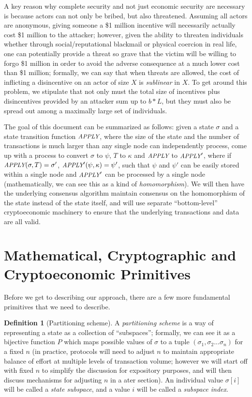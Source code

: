 \documentclass[11pt,a4paper]{article}
\theoremstyle{plain}
\theoremstyle{definition}
\newtheorem{defn}{Definition}[section]
\theoremstyle{remark}
\newcommand{\makeintoafunction}[1]{\textit{\uppercase{\small #1}}}
\newcommand{\APPLY}{\makeintoafunction{apply}}
\begin{document}
A key reason why complete security and not just economic security are necessary is because actors can not only be bribed, but also threatened. Assuming all actors are anonymous, giving someone a \$1 million incentive will necessarily actually cost \$1 million to the attacker; however, given the ability to threaten individuals whether through social/reputational blackmail or physical coercion in real life, one can potentially provide a threat so grave that the victim will be willing to forgo \$1 million in order to avoid the adverse consequence at a much lower cost than \$1 million; formally, we can say that when threats are allowed, the cost of inflicting a disincentive on an actor of size $X$ is \emph{sublinear} in $X$. To get around this problem, we stipulate that not only must the total size of incentives plus disincentives provided by an attacker sum up to $b * L$, but they must also be spread out among a maximally large set of individuals.

The goal of this document can be summarized as follows: given a state $\sigma$ and a state transition function $\APPLY$, where the size of the state and the number of transactions is much larger than any single node can independently process, come up with a process to convert $\sigma$ to $\psi$, $T$ to $\kappa$ and $\APPLY$ to $\APPLY'$, where if $\APPLY(\sigma, T) = \sigma'$, $\APPLY'(\psi, \kappa) = \psi'$, such that $\psi$ and $\psi'$ can be easily stored within a single node and $\APPLY'$ can be processed by a single node (mathematically, we can see this as a kind of \emph{homomorphism}). We will then have the underlying consensus algorithm maintain consensus on the homomorphism of the state instead of the state itself, and will use separate ``bottom-level'' cryptoeconomic machinery to ensure that the underlying transactions and data are all valid.

\section{Mathematical, Cryptographic and Cryptoeconomic Primitives}

Before we get to describing our approach, there are a few more fundamental primitives that we need to describe.

\begin{defn}[Partitioning scheme]
A \emph{partitioning scheme} is a way of representing a state as a collection of ``subspaces''; formally, we can see it as a bijective function $P$ which maps possible values of $\sigma$ to a tuple $(\sigma_1, \sigma_2 ... \sigma_n)$ for a fixed $n$ (in practice, protocols will need to adjust $n$ to maintain appropriate balance of effort at multiple levels of transaction volume; however we will start off with fixed $n$ to simplify the discussion for expository purposes, and will then discuss mechanisms for adjusting $n$ in a ater section). An individual value $\sigma[i]$ will be called a \emph{state subspace}, and a value $i$ will be called a \emph{subspace index}.
\end{defn}
\end{document}
